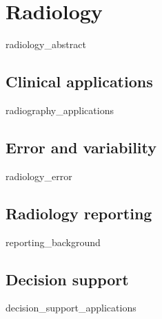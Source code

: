 \chapter{Radiology}
{radiology_abstract}
\clearpage


\section{Clinical applications}
{radiography_applications}
\clearpage

\section{Error and variability}
{radiology_error}
\clearpage

\section{Radiology reporting}
{reporting_background}
\clearpage

\section{Decision support}
{decision_support_applications}
\clearpage
